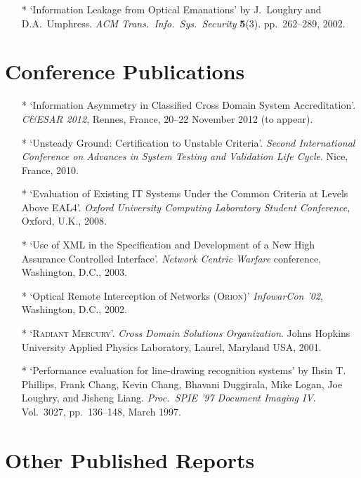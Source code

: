 \documentclass[letterpaper]{article}
\begin{document}
\begin{itemize}
    \item[*] `Information Leakage from Optical Emanations' by J.\ Loughry
    and D.A.\ Umphress. \emph{ACM Trans.\ Info.\ Sys.\ Security} \textbf{5}(3).
    pp.\ 262--289, 2002.
\end{itemize}

\section*{Conference Publications} %

\begin{itemize}
	\item[*] `Information Asymmetry in Classified Cross Domain System Accreditation'.
		\emph{C\&ESAR 2012}, Rennes, France, 20--22 November 2012 (to appear).

	\item[*] `Unsteady Ground: Certification to Unstable Criteria'.
		\emph{Second International Conference on Advances in System Testing
		and Validation Life Cycle}. Nice, France, 2010. 

	\item[*] `Evaluation of Existing IT Systems Under the Common Criteria
		at Levels Above EAL4'. \emph{Oxford University
		Computing Laboratory Student Conference}, Oxford, U.K., 2008.

    \item[*] `Use of XML in the Specification and Development of a New High
		Assurance Controlled Interface'. \emph{Network Centric Warfare} conference,
		Washington, D.C., 2003.

    \item[*] `Optical Remote Interception of Networks (\textsc{Orion})'
		\emph{InfowarCon '02}, Washington, D.C., 2002.

    \item[*] `\textsc{Radiant Mercury}'. \emph{Cross Domain Solutions
		Organization}. Johns Hopkins University Applied Physics Laboratory,
		Laurel, Maryland USA, 2001.

    \item[*] `Performance evaluation for line-drawing recognition systems'
		by Ihsin T. Phillips, Frank Chang, Kevin Chang, Bhavani Duggirala,
		Mike Logan, Joe Loughry, and Jisheng Liang. \emph{Proc.\ SPIE '97
		Document Imaging IV}. Vol.\ 3027, pp.\ 136--148, March 1997.
\end{itemize}

\section*{Other Published Reports} %
\end{document}
